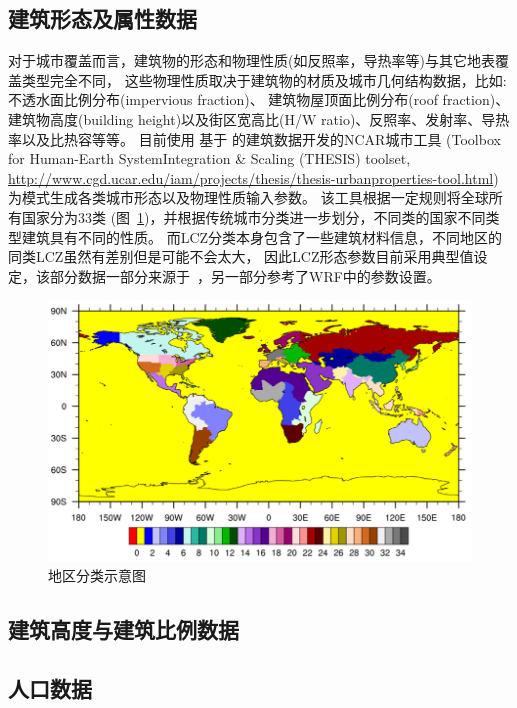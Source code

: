 \subsection{建筑形态及属性数据}\label{建筑形态及属性数据}
对于城市覆盖而言，建筑物的形态和物理性质(如反照率，导热率等)与其它地表覆盖类型完全不同，
这些物理性质取决于建筑物的材质及城市几何结构数据，比如: 不透水面比例分布(impervious fraction)、
建筑物屋顶面比例分布(roof fraction)、建筑物高度(building height)以及街区宽高比(H/W ratio)、反照率、发射率、导热率以及比热容等等。
目前使用 \citet{oleson2020parameterization} 基于 \citet{jackson2013parameterization} 的建筑数据开发的NCAR城市工具
(Toolbox for Human-Earth SystemIntegration \& Scaling (THESIS) toolset, \url{http://www.cgd.ucar.edu/iam/projects/thesis/thesis-urbanproperties-tool.html})
为模式生成各类城市形态以及物理性质输入参数。
该工具根据一定规则将全球所有国家分为33类 (图~\ref{fig:地区分类})，并根据传统城市分类进一步划分，不同类的国家不同类型建筑具有不同的性质。
%
而LCZ分类本身包含了一些建筑材料信息，不同地区的同类LCZ虽然有差别但是可能不会太大，
因此LCZ形态参数目前采用典型值设定，该部分数据一部分来源于~\citet{stewart2014evaluation}，另一部分参考了WRF中的参数设置。
{
\begin{figure}[htbp]
\centering
\includegraphics{Figures/基础数据/地区分类.png}
\caption{地区分类示意图}
\label{fig:地区分类}
\end{figure}
}


\subsection{建筑高度与建筑比例数据}\label{建筑高度与建筑比例数据}


\subsection{人口数据}\label{人口数据}


